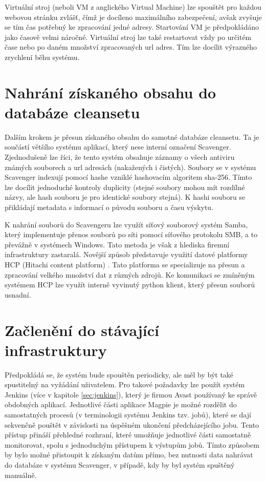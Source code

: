 \documentclass[thesis=M,czech,hidelinks]{FITthesis}[2013/05/06]
\begin{document}
Virtuální stroj (neboli VM z anglického Virtual Machine) lze spouštět pro každou webovou stránku zvlášť, čímž je docíleno maximálního zabezpečení, avšak zvyšuje se tím čas potřebný ke zpracování jedné adresy. Startování VM je předpokládáno jako časově velmi náročné.  Virtuální stroj lze také restartovat vždy po určitém čase nebo po daném množství zpracovaných url adres. Tím lze docílit výrazného zrychlení běhu systému.





\section{Nahrání získaného obsahu do databáze cleansetu}
Dalším krokem je přesun získaného obsahu do samotné databáze cleansetu. Ta je součástí většího systému aplikací, který nese interní označení Scavenger. Zjednodušeně lze říci, že tento systém obsahuje záznamy o všech antiviru známých souborech a url adresách (nakažených i čistých). Soubory se v systému Scavenger indexují pomocí hashe vzniklé hashovacím algoritem sha-256. Tímto lze docílit jednoduché kontroly duplicity (stejné soubory mohou mít rozdílné názvy, ale hash souboru je pro identické soubory stejná). K hashi souboru se přikládají metadata s informací o původu souboru a času výskytu. 

K nahrání souborů do Scavengeru lze využít síťový souborový systém Samba, který implementuje přenos souborů po síti pomocí síťového protokolu SMB, a to převážně v systémech Windows. Tato metoda je však z hlediska firemní infrastruktury zastaralá. Novější způsob představuje využití datové platformy HCP (Hitachi content platform) \cite{hcp}. Tato platforma se specializuje na přesun a zpracování velkého množství dat z různých zdrojů. Ke komunikaci se zmíněným systémem HCP lze využít interně vyvinutý python klient, který přesun souborů usnadní.





\section{Začlenění do stávající infrastruktury}
Předpokládá se, že systém bude spouštěn periodicky, ale měl by být také spustitelný na vyžádání uživatelem. Pro takové požadavky lze použít systém Jenkins (více v kapitole \ref{sec:jenkins}), který je firmou Avast používaný ke správě obdobných aplikací. Jednotlivé části aplikace Magpie je možné rozdělit do samostatných procesů (v terminologii systému Jenkins tzv. jobů), které se dají sekvenčně pouštět v závislosti na úspěšném ukončení předcházejícího jobu. Tento přístup přináší přehledné rozhraní, které umožňuje jednotlivé části samostatně monitorovat, spolu s jednoduchým přístupem k výstupům jobů. Tímto způsobem by bylo možné přistoupit k získaným datům přímo, bez nutnosti data nahrávat do databáze v systému Scavenger, v případě, kdy by byl systém spuštěný manuálně.
\end{document}
